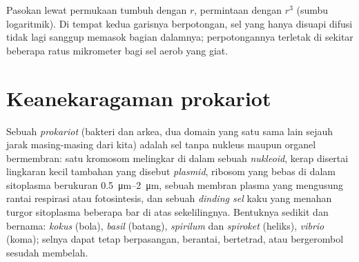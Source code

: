 \begin{omfigure}

{\small Pasokan lewat permukaan tumbuh dengan $r$, permintaan dengan
$r^3$ (sumbu logaritmik). Di tempat kedua garisnya berpotongan, sel yang
hanya disuapi difusi tidak lagi sanggup memasok bagian dalamnya;
perpotongannya terletak di sekitar beberapa ratus mikrometer bagi sel
aerob yang giat.}
\end{omfigure}

\section{Keanekaragaman prokariot}

\begin{definition}\label{def:b2:unicellular-diversity:prokaryote}
Sebuah \emph{prokariot} (bakteri dan arkea, dua domain
yang satu sama lain sejauh jarak masing-masing dari kita) adalah sel
tanpa nukleus maupun organel bermembran: satu kromosom melingkar di
dalam sebuah \emph{nukleoid}, kerap disertai lingkaran
kecil tambahan yang disebut \emph{plasmid}, ribosom yang
bebas di dalam sitoplasma berukuran \qtyrange{0.5}{2}{\micro m}, sebuah
membran plasma yang mengusung rantai respirasi atau fotosintesis, dan
sebuah \emph{dinding sel} kaku yang menahan
turgor sitoplasma beberapa bar di atas sekelilingnya. Bentuknya sedikit
dan bernama: \emph{kokus} (bola), \emph{basil} (batang),
\emph{spirilum} dan \emph{spiroket} (heliks), \emph{vibrio} (koma);
selnya dapat tetap berpasangan, berantai, bertetrad, atau bergerombol
sesudah membelah.
\end{definition}

